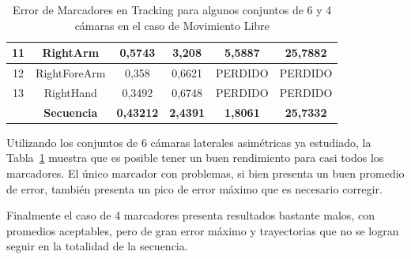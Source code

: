\begin{table}[ht!]
{\begin{tabular}{c|c|c|c|c|c|}
\multicolumn{1}{|c|}{11} & RightArm & 0,5743 & 3,208 & 5,5887 & 25,7882 \\ \hline
\multicolumn{1}{|c|}{12} & RightForeArm & 0,358 & 0,6621 & PERDIDO & PERDIDO \\ \hline
\multicolumn{1}{|c|}{13} & RightHand & 0,3492 & 0,6748 & PERDIDO & PERDIDO \\ \hline
 & \textbf{Secuencia} & \textbf{0,43212} & \textbf{2,4391} & \textbf{1,8061} & \textbf{25,7332} \\ \cline{2-6} 
\end{tabular}
}
\caption{Error de Marcadores en Tracking para algunos conjuntos de 6 y 4 cámaras en el caso de Movimiento Libre}
\label{error_captura_libre_6_4}
\end{table}


Utilizando los conjuntos de 6 cámaras laterales asimétricas ya estudiado, la Tabla~\ref{error_captura_libre_6_4} muestra que es posible tener un buen rendimiento para casi todos los marcadores. El único marcador con problemas, si bien presenta un buen promedio de error, también presenta un pico de error máximo que es necesario corregir. 


Finalmente el caso de 4 marcadores presenta resultados bastante malos, con promedios aceptables, pero de gran error máximo y trayectorias que no se logran seguir en la totalidad de la secuencia.








